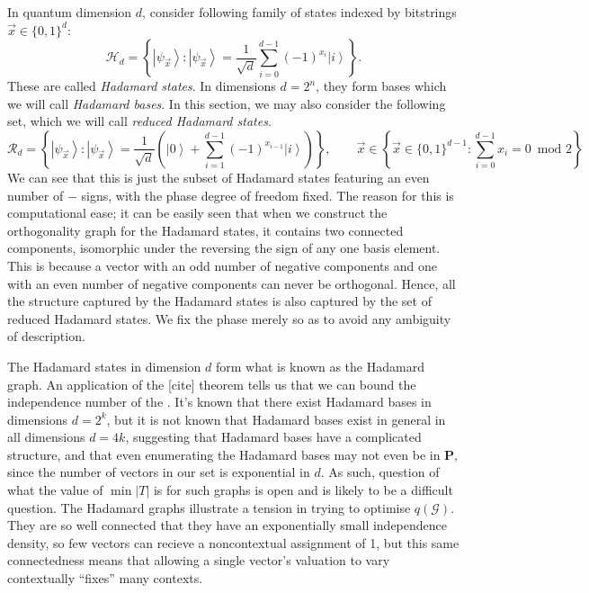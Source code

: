 \documentclass{amsart}
\theoremstyle{definition}
\newcommand{\ket}[1]{{\left\vert{#1}\right\rangle}}
\begin{document}
In quantum dimension $d$, consider following family of states indexed by bitstrings $\vec{x}\in\{0,1\}^d$:
\begin{equation}
\mathcal{H}_d=\left\{ \ket{\psi_{\vec{x}}}:\ket{\psi_{\vec{x}}} = \frac{1}{\sqrt{d}}\sum_{i=0}^{d-1}(-1)^{x_i}\ket{i}  \right\}.
\end{equation}
These are called \emph{Hadamard states}. In dimensions $d=2^n$, they form bases which we will call \emph{Hadamard bases}. In this section, we may also consider the following set, which we will call \emph{reduced Hadamard states}.
\begin{equation}
\mathcal{R}_d=\left\{ \ket{\psi_{\vec{x}}}:\ket{\psi_{\vec{x}}} = \frac{1}{\sqrt{d}}\left(\ket{0}+\sum_{i=1}^{d-1}(-1)^{x_{i-1}}\ket{i}  \right)\right\}, \qquad\vec{x}\in\left\{\vec{x}\in\{0,1\}^{d-1}:\sum_{i=0}^{d-1} x_i =0 \enspace \mbox{mod 2}\right\}
\end{equation}
We can see that this is just the subset of Hadamard states featuring an even number of $-$ signs, with the phase degree of freedom fixed. The reason for this is computational ease; it can be easily seen that when we construct the orthogonality graph for the Hadamard states, it contains two connected components, isomorphic under the reversing the sign of any one basis element. This is because a vector with an odd number of negative components and one with an even number of negative components can never be orthogonal. Hence, all the structure captured by the Hadamard states is also captured by the set of reduced Hadamard states. We fix the phase merely so as to avoid any ambiguity of description.

The Hadamard states in dimension $d$ form what is known as the Hadamard graph. An application of the [cite] theorem tells us that we can bound the independence number of the . It's known that there exist Hadamard bases in dimensions $d=2^k$, but it is not known that Hadamard bases exist in general in all dimensions $d=4k$, suggesting that Hadamard bases have a complicated structure, and that even enumerating the Hadamard bases may not even be in \textbf{P}, since the number of vectors in our set is exponential in $d$. As such, question of what the value of $\min|T|$  is for such graphs is open and is likely to be a difficult question. The Hadamard graphs illustrate a tension in trying to optimise $q(\mathcal{G})$. They are so well connected that they have an exponentially small independence density, so few vectors can recieve a noncontextual assignment of 1, but this same connectedness means that allowing a single vector's valuation to vary contextually ``fixes'' many contexts.
\end{document}
